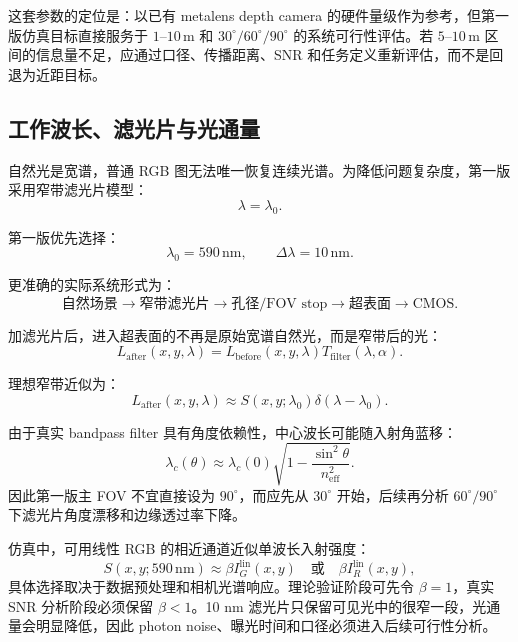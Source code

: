 \documentclass[11pt,a4paper,fontset=none]{ctexart}
\begin{document}
这套参数的定位是：以已有 metalens depth camera 的硬件量级作为参考，但第一版仿真目标直接服务于 $1$--$10\,\mathrm{m}$ 和 $30^\circ/60^\circ/90^\circ$ 的系统可行性评估。若 $5$--$10\,\mathrm{m}$ 区间的信息量不足，应通过口径、传播距离、SNR 和任务定义重新评估，而不是回退为近距目标。

\subsection{工作波长、滤光片与光通量}

自然光是宽谱，普通 RGB 图无法唯一恢复连续光谱。为降低问题复杂度，第一版采用窄带滤光片模型：
\begin{equation}
  \lambda=\lambda_0.
\end{equation}

第一版优先选择：
\begin{equation}
  \lambda_0=590\,\mathrm{nm},\qquad \Delta\lambda=10\,\mathrm{nm}.
\end{equation}

更准确的实际系统形式为：
\begin{equation}
  \text{自然场景}
  \rightarrow
  \text{窄带滤光片}
  \rightarrow
  \text{孔径/FOV stop}
  \rightarrow
  \text{超表面}
  \rightarrow
  \text{CMOS}.
\end{equation}

加滤光片后，进入超表面的不再是原始宽谱自然光，而是窄带后的光：
\begin{equation}
  L_{\mathrm{after}}(x,y,\lambda)
  =
  L_{\mathrm{before}}(x,y,\lambda)
  T_{\mathrm{filter}}(\lambda,\alpha).
\end{equation}

理想窄带近似为：
\begin{equation}
  L_{\mathrm{after}}(x,y,\lambda)
  \approx
  S(x,y;\lambda_0)\delta(\lambda-\lambda_0).
\end{equation}

由于真实 bandpass filter 具有角度依赖性，中心波长可能随入射角蓝移：
\begin{equation}
  \lambda_c(\theta)
  \approx
  \lambda_c(0)
  \sqrt{1-\frac{\sin^2\theta}{n_{\mathrm{eff}}^2}}.
\end{equation}
因此第一版主 FOV 不宜直接设为 $90^\circ$，而应先从 $30^\circ$ 开始，后续再分析 $60^\circ/90^\circ$ 下滤光片角度漂移和边缘透过率下降。

仿真中，可用线性 RGB 的相近通道近似单波长入射强度：
\begin{equation}
  S(x,y;590\,\mathrm{nm})\approx \beta I_G^{\mathrm{lin}}(x,y)
  \quad \text{或} \quad
  \beta I_R^{\mathrm{lin}}(x,y),
\end{equation}
具体选择取决于数据预处理和相机光谱响应。理论验证阶段可先令 $\beta=1$，真实 SNR 分析阶段必须保留 $\beta<1$。10 nm 滤光片只保留可见光中的很窄一段，光通量会明显降低，因此 photon noise、曝光时间和口径必须进入后续可行性分析。
\end{document}
